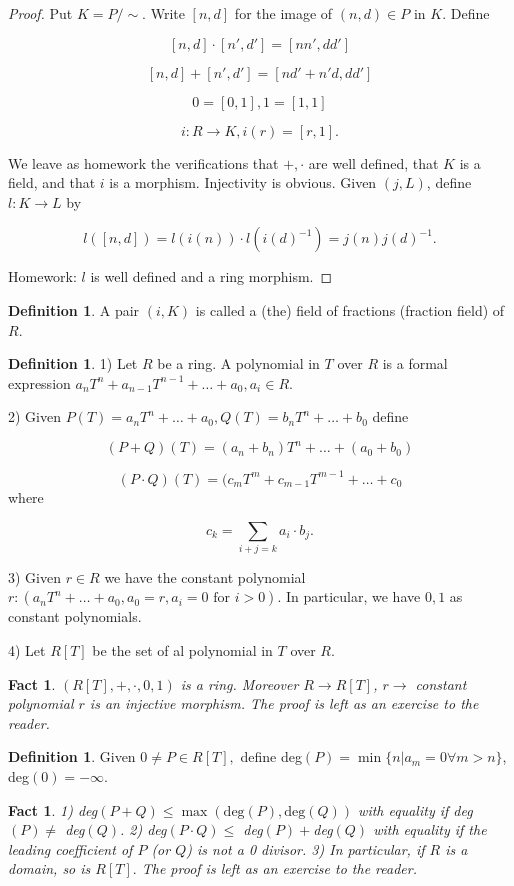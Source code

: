 \documentclass{amsart}
\newtheorem{fact}[thm]{Fact}
\theoremstyle{definition}
\newtheorem{defn}[thm]{Definition}
\theoremstyle{remark}
\begin{document}
\begin{proof}
Put $K=P/\sim.$ Write $[n,d]$ for the image of $(n,d)\in P$ in $K$. Define

$$[n,d]\cdot[n',d']=[nn',dd']$$

$$[n,d]+[n',d']=[nd'+n'd,dd']$$

$$0=[0,1],1=[1,1]$$

$$i:R\rightarrow K, i(r)=[r,1].$$

We leave as homework the verifications that $+,\cdot$ are well defined, that $K$ is a field, and that $i$ is a morphism. Injectivity is obvious. Given $(j,L)$, define $l:K\longrightarrow L$ by 

$$l([n,d])=l(i(n))\cdot l(i(d)^{-1})=j(n)j(d)^{-1}.$$

Homework: $l$ is well defined and a ring morphism.

\end{proof}

\begin{defn}

A pair $(i,K)$ is called a (the) field of fractions (fraction field) of $R$.

\end{defn}

\begin{defn}

1) Let $R$ be a ring. A polynomial in $T$ over $R$ is a formal expression $a_nT^n+a_{n-1}T^{n-1}+\ldots+a_0,a_i\in R.$

2) Given $P(T)=a_nT^n+\ldots+a_0,Q(T)=b_nT^n+\ldots+b_0$ define

$$(P+Q)(T)=(a_n+b_n)T^n+\ldots+(a_0+b_0)$$

$$(P\cdot Q)(T)=(c_mT^m+c_{m-1}T^{m-1}+\ldots+c_0$$ where 

$$c_k=\sum_{i+j=k}a_i\cdot b_j.$$

3) Given $r\in R$ we have the constant polynomial
$r:(a_nT^n+\ldots+a_0,a_0=r,a_i=0\text{ for } i>0).$ In particular, we have $0,1$ as constant polynomials.

4) Let $R[T]$ be the set of al polynomial in $T$ over $R$. 

\begin{fact} $(R[T],+,\cdot,0,1)$ is a ring. Moreover $R\rightarrow R[T]$, $r\rightarrow$ constant polynomial $r$ is an injective morphism. The proof is left as an exercise to the reader.
\end{fact}

\end{defn}

\begin{defn}

Given $0\ne P\in R[T],$ define deg$(P)=\min\{n|a_m=0\forall m>n\}$, deg$(0)=-\infty$.
\end{defn}
\begin{fact}
1) deg$(P+Q)\leq\max(\text{deg}(P),\text{deg}(Q))$ with equality if deg$(P)\ne$ deg$(Q)$.
2) deg$(P\cdot Q)\leq$ deg$(P)+$deg$(Q)$ with equality if the leading coefficient of $P$ (or $Q$) is not a 0 divisor.
3) In particular, if $R$ is a domain, so is $R[T].$ The proof is left as an exercise to the reader.
\end{fact}
\end{document}
